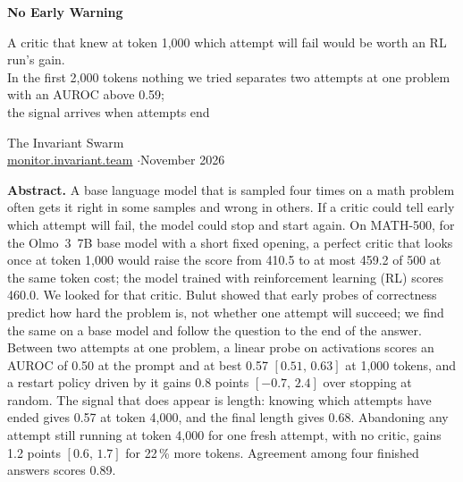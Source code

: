 \documentclass[10pt]{article}
\newcommand{\ci}[2]{$[#1,\,#2]$}
\begin{document}
\begin{center}
{\sffamily\bfseries\LARGE No Early Warning\par}
\vspace{0.4em}
{\sffamily\large A critic that knew at token 1{,}000 which attempt will fail would be worth an RL run's gain.\\ In the first 2{,}000 tokens nothing we tried separates two attempts at one problem with an AUROC above 0.59;\\ the signal arrives when attempts end\par}
\vspace{1.0em}
{\large The Invariant Swarm}\\[0.25em]
{\small \href{https://monitor.invariant.team}{monitor.invariant.team} \quad$\cdot$\quad November 2026}
\end{center}

\vspace{0.2em}
\begin{center}\begin{minipage}{0.88\textwidth}
\small
\textbf{Abstract.} A base language model that is sampled four times on a math problem often gets it right in some
samples and wrong in others. If a critic could tell early which attempt will fail, the model could stop and start
again. On MATH-500, for the Olmo~3~7B base model with a short fixed opening, a perfect critic that looks once at
token 1{,}000 would raise the score from 410.5 to at most 459.2 of 500 at the same token cost; the model trained
with reinforcement learning (RL) scores 460.0. We looked for that critic. Bulut showed that early probes of
correctness predict how hard the problem is, not whether one attempt will succeed; we find the same on a base model and follow the question to
the end of the answer. Between two attempts at one problem, a linear probe on activations scores an AUROC of
0.50 at the prompt and at best 0.57 \ci{0.51}{0.63} at 1{,}000 tokens, and a restart policy driven by it gains
0.8 points \ci{-0.7}{2.4} over stopping at random. The signal that does appear is length: knowing which attempts have
ended gives 0.57 at token 4{,}000, and the final length gives 0.68. Abandoning any attempt still running at token
4{,}000 for one fresh attempt, with no critic, gains 1.2 points \ci{0.6}{1.7} for 22\,\% more tokens. Agreement among four finished answers scores 0.89.
\end{minipage}\end{center}
\end{document}
